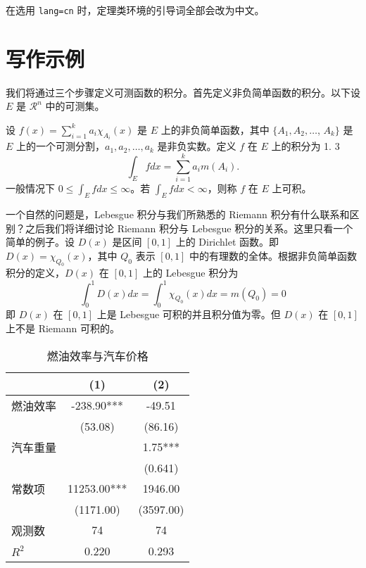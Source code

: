 \documentclass[cn,geye,blue,14pt,normal]{elegantnote}
\begin{document}
\begin{remark}
  在选用 \lstinline{lang=cn} 时，定理类环境的引导词全部会改为中文。
\end{remark}


\section{写作示例}

我们将通过三个步骤定义可测函数的积分。首先定义非负简单函数的积分。以下设 $E$ 是 $\mathcal{R}^n$ 中的可测集。

\begin{definition}[可积性]
  设 $ f(x)=\sum\limits_{i=1}^{k} a_i \chi_{A_i}(x)$ 是 $E$ 上的非负简单函数，其中 $\{A_1,A_2,\ldots$, $A_k\}$ 是 $E$ 上的一个可测分割，$a_1,a_2,\ldots,a_k$ 是非负实数。定义 $f$ 在 $E$ 上的积分为 1. 3
  \begin{equation}
    \label{inter}
    \int_{E} f dx = \sum_{i=1}^k a_i m(A_i).
  \end{equation}
  一般情况下 $0 \leq \int_{E} f dx \leq \infty$。若 $\int_{E} f dx < \infty$，则称 $f$ 在 $E$ 上可积。
\end{definition}

一个自然的问题是，Lebesgue 积分与我们所熟悉的 Riemann 积分有什么联系和区别？之后我们将详细讨论 Riemann 积分与 Lebesgue 积分的关系。这里只看一个简单的例子。设 $D(x)$ 是区间 $[0,1]$ 上的 Dirichlet 函数。即 $D(x)=\chi_{Q_0}(x)$，其中 $Q_0$ 表示 $[0,1]$ 中的有理数的全体。根据非负简单函数积分的定义，$D(x)$ 在 $[0,1]$ 上的 Lebesgue 积分为
\begin{equation}\label{inter2}
  \int_0^1 D(x)dx = \int_0^1 \chi_{Q_0} (x) dx = m(Q_0) = 0
\end{equation}
即 $D(x)$ 在 $[0,1]$ 上是 Lebesgue 可积的并且积分值为零。但 $D(x)$ 在 $[0,1]$ 上不是 Riemann 可积的。

\begin{table}[htbp]
  \centering
  \small
  \caption{燃油效率与汽车价格}
  \begin{tabular}{lcc}
    \toprule
             & (1)         & (2)       \\
    \midrule
    燃油效率 & -238.90***  & -49.51    \\
             & (53.08)     & (86.16)   \\
    汽车重量 &             & 1.75***   \\
             &             & (0.641)   \\
    常数项   & 11253.00*** & 1946.00   \\
             & (1171.00)   & (3597.00) \\
    观测数   & 74          & 74        \\
    $R^2$    & 0.220       & 0.293     \\
    \bottomrule
  \end{tabular}%
  \label{tab:reg}%
\end{table}%
\end{document}
